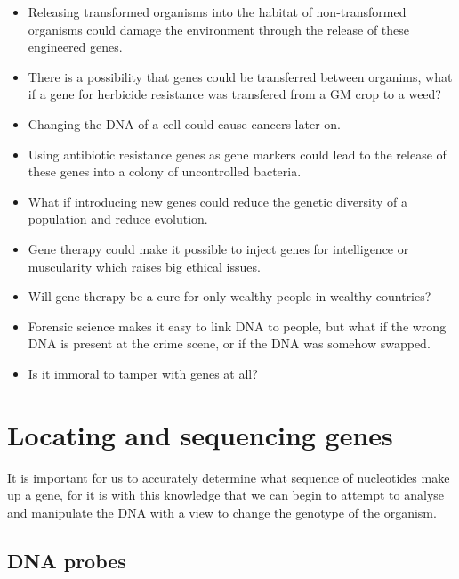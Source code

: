 \documentclass{article}
\begin{document}
\begin{itemize}
	
	\item Releasing transformed organisms into the habitat of non-transformed
	organisms could damage the environment through the release of these
	engineered genes.

	\item There is a possibility that genes could be transferred between
	organims, what if a gene for herbicide resistance was transfered from a GM
	crop to a weed?

	\item Changing the DNA of a cell could cause cancers later on.

	\item Using antibiotic resistance genes as gene markers could lead to the
	release of these genes into a colony of uncontrolled bacteria.

	\item What if introducing new genes could reduce the genetic diversity of a
	population and reduce evolution.

	\item Gene therapy could make it possible to inject genes for intelligence
	or muscularity which raises big ethical issues.

	\item Will gene therapy be a cure for only wealthy people in wealthy
	countries?

	\item Forensic science makes it easy to link DNA to people, but what if the
	wrong DNA is present at the crime scene, or if the DNA was somehow swapped.

	\item Is it immoral to tamper with genes at all?

\end{itemize}

\section*{Locating and sequencing genes}

It is important for us to accurately determine what sequence of nucleotides make
up a gene, for it is with this knowledge that we can begin to attempt to analyse
and manipulate the DNA with a view to change the genotype of the organism.

\subsection*{DNA probes}
\end{document}
